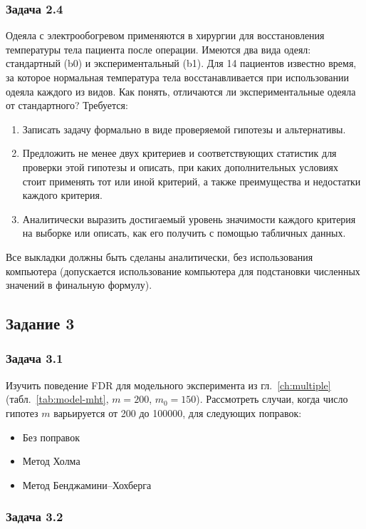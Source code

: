 \subsubsection{Задача 2.4}

Одеяла с электрообогревом применяются в хирургии для восстановления температуры тела пациента после операции. 
Имеются два вида одеял: стандартный (b0) и экспериментальный (b1). 
Для 14 пациентов известно время, за которое нормальная температура тела восстанавливается при использовании одеяла каждого из видов.
Как понять, отличаются ли экспериментальные одеяла от стандартного?
Требуется:
\begin{enumerate}
    \item Записать задачу формально в виде проверяемой гипотезы и альтернативы.
    \item Предложить не менее двух критериев и соответствующих статистик для проверки этой гипотезы и описать, при каких дополнительных условиях стоит применять тот или иной критерий, а также преимущества и недостатки каждого критерия.
    \item Аналитически выразить достигаемый уровень значимости каждого критерия на выборке или описать, как его получить с помощью табличных данных.
\end{enumerate}
Все выкладки должны быть сделаны аналитически, без использования компьютера (допускается использование компьютера для подстановки численных значений в финальную формулу).

\subsection{Задание 3}


\subsubsection{Задача 3.1}

Изучить поведение FDR для модельного эксперимента из гл.~\ref{ch:multiple} (табл.~\ref{tab:model-mht}, $m=200$, $m_0=150$). Рассмотреть случаи, когда число гипотез $m$ варьируется от 200 до 100000, для следующих поправок:
\begin{itemize}
    \item Без поправок
    \item Метод Холма
    \item Метод Бенджамини--Хохберга
\end{itemize}

\subsubsection{Задача 3.2}

